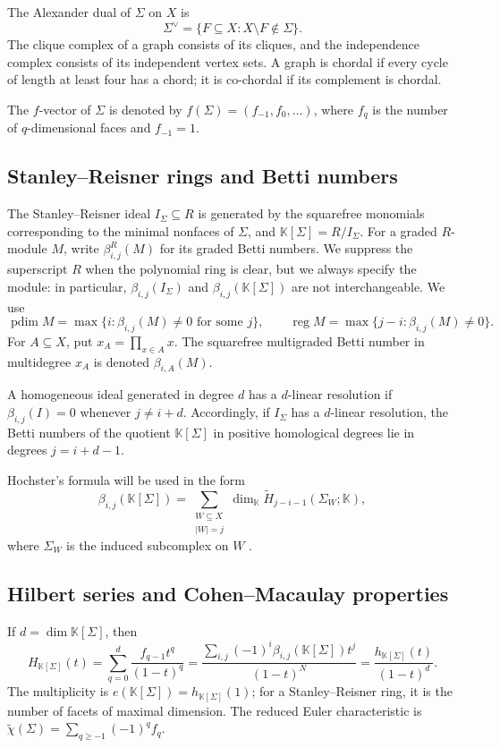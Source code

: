 \documentclass[11pt]{amsart}
\theoremstyle{definition}
\theoremstyle{remark}
\newcommand{\K}{\mathbb K}
\newcommand{\SR}[1]{\K[#1]}
\DeclareMathOperator{\pdim}{pdim}
\DeclareMathOperator{\reg}{reg}
\begin{document}
	The Alexander dual of $\Sigma$ on $X$ is
	\[
	\Sigma^\vee=\{F\subseteq X:X\setminus F\notin\Sigma\}.
	\]
	The clique complex of a graph consists of its cliques, and the independence complex consists of its independent vertex sets. A graph is chordal if every cycle of length at least four has a chord; it is co-chordal if its complement is chordal.
	
	The $f$-vector of $\Sigma$ is denoted by $f(\Sigma)=(f_{-1},f_0,\ldots)$, where $f_q$ is the number of $q$-dimensional faces and $f_{-1}=1$.
	
	\subsection{Stanley--Reisner rings and Betti numbers}
	
	The Stanley--Reisner ideal $I_\Sigma\subseteq R$ is generated by the squarefree monomials corresponding to the minimal nonfaces of $\Sigma$, and $\SR{\Sigma}=R/I_\Sigma$. For a graded $R$-module $M$, write $\beta_{i,j}^R(M)$ for its graded Betti numbers. We suppress the superscript $R$ when the polynomial ring is clear, but we always specify the module: in particular, $\beta_{i,j}(I_\Sigma)$ and $\beta_{i,j}(\SR{\Sigma})$ are not interchangeable. We use
	\[
	\pdim M=\max\{i:\beta_{i,j}(M)\ne0\text{ for some }j\},
	\qquad
	\reg M=\max\{j-i:\beta_{i,j}(M)\ne0\}.
	\]
	For $A\subseteq X$, put $x_A=\prod_{x\in A}x$. The squarefree multigraded Betti number in multidegree $x_A$ is denoted $\beta_{i,A}(M)$.
	
	A homogeneous ideal generated in degree $d$ has a $d$-linear resolution if $\beta_{i,j}(I)=0$ whenever $j\ne i+d$. Accordingly, if $I_\Sigma$ has a $d$-linear resolution, the Betti numbers of the quotient $\SR{\Sigma}$ in positive homological degrees lie in degrees $j=i+d-1$.
	
	Hochster's formula will be used in the form
	\[
	\beta_{i,j}(\SR{\Sigma})
	=
	\sum_{\substack{W\subseteq X\\ |W|=j}}
	\dim_{\K}\widetilde H_{j-i-1}(\Sigma_W;\K),
	\]
	where $\Sigma_W$ is the induced subcomplex on $W$ \cite{Ho77}.
	
	\subsection{Hilbert series and Cohen--Macaulay properties}
	
	If $d=\dim\SR{\Sigma}$, then
	\[
	H_{\SR{\Sigma}}(t)
	=
	\sum_{q=0}^{d}\frac{f_{q-1}t^q}{(1-t)^q}
	=
	\frac{\sum_{i,j}(-1)^i\beta_{i,j}(\SR{\Sigma})t^j}{(1-t)^N}
	=
	\frac{h_{\SR{\Sigma}}(t)}{(1-t)^d}.
	\]
	The multiplicity is $e(\SR{\Sigma})=h_{\SR{\Sigma}}(1)$; for a Stanley--Reisner ring, it is the number of facets of maximal dimension. The reduced Euler characteristic is $\widetilde\chi(\Sigma)=\sum_{q\ge-1}(-1)^qf_q$.
	
\end{document}
